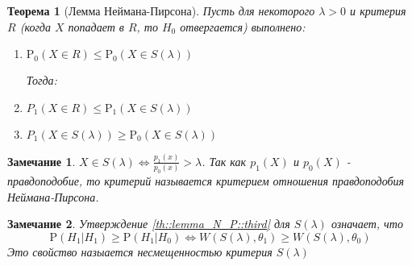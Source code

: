 \documentclass[12pt]{article}
\theoremstyle{theorem}
\newtheorem{theorem}{Теорема}
\newtheorem*{remark}{Замечание}
\def\P{
    \mathrm{P}
}
\begin{document}
\begin{theorem}[Лемма Неймана-Пирсона]
    \label{th::lemma_N_P}
    Пусть для некоторого $\lambda > 0$ и критерия $R$
    (когда $X$ попадает в $R$, то $H_0$ отвергается)
    выполнено:
    \begin{enumerate}
        \item \label{th::lemma_N_P::first}  $\P_0(X\in R) \leq \P_0(X\in S(\lambda))$

        Тогда: 
        \item \label{th::lemma_N_P::second} $P_1(X\in R) \leq \P_1(X\in S(\lambda))$
        \item \label{th::lemma_N_P::third}  $P_1(X\in S(\lambda)) \geq \P_0(X\in S(\lambda))$
    \end{enumerate}
\end{theorem}
\begin{remark}
    $X\in S(\lambda) \Leftrightarrow \frac{p_1(x)}{p_0(x)} > \lambda$.
    Так как $p_1(X)$ и $p_0(X)$ - правдоподобие, то критерий
    называется критерием отношения правдоподобия Неймана-Пирсона.
\end{remark}
\begin{remark}
    Утверждение \ref{th::lemma_N_P::third} для $S(\lambda)$
    означает, что
    $$\P(H_1 | H_1) \geq \P(H_1|H_0) \Leftrightarrow W(S(\lambda), \theta_1) \geq W(S(\lambda), \theta_0)$$
    Это свойство назыается несмещенностью критерия $S(\lambda)$
\end{remark}
\end{document}
